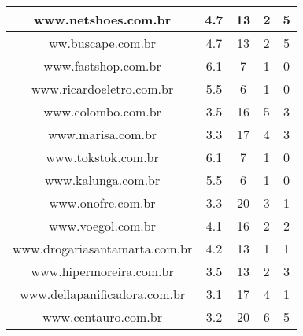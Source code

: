 \begin{center}
\begin{longtable}{|l|l|l|l|l|}
\hline
\multicolumn{1}{|c|}{www.netshoes.com.br} & \multicolumn{1}{c|}{4.7} & \multicolumn{1}{c|}{13} & \multicolumn{1}{c|}{2} & \multicolumn{1}{c|}{5} \\ 
\hline
\multicolumn{1}{|c|}{ww.buscape.com.br} & \multicolumn{1}{c|}{4.7} & \multicolumn{1}{c|}{13} & \multicolumn{1}{c|}{2} & \multicolumn{1}{c|}{5} \\ 
\hline
\multicolumn{1}{|c|}{www.fastshop.com.br} & \multicolumn{1}{c|}{6.1} & \multicolumn{1}{c|}{7} & \multicolumn{1}{c|}{1} & \multicolumn{1}{c|}{0} \\ 
\hline
\multicolumn{1}{|c|}{www.ricardoeletro.com.br} & \multicolumn{1}{c|}{5.5} & \multicolumn{1}{c|}{6} & \multicolumn{1}{c|}{1} & \multicolumn{1}{c|}{0} \\ 
\hline
\multicolumn{1}{|c|}{www.colombo.com.br} & \multicolumn{1}{c|}{3.5} & \multicolumn{1}{c|}{16} & \multicolumn{1}{c|}{5} & \multicolumn{1}{c|}{3} \\ 
\hline
\multicolumn{1}{|c|}{www.marisa.com.br} & \multicolumn{1}{c|}{3.3} & \multicolumn{1}{c|}{17} & \multicolumn{1}{c|}{4} & \multicolumn{1}{c|}{3} \\ 
\hline
\multicolumn{1}{|c|}{www.tokstok.com.br} & \multicolumn{1}{c|}{6.1} & \multicolumn{1}{c|}{7} & \multicolumn{1}{c|}{1} & \multicolumn{1}{c|}{0} \\ 
\hline
\multicolumn{1}{|c|}{www.kalunga.com.br} & \multicolumn{1}{c|}{5.5} & \multicolumn{1}{c|}{6} & \multicolumn{1}{c|}{1} & \multicolumn{1}{c|}{0} \\ 
\hline
\multicolumn{1}{|c|}{www.onofre.com.br} & \multicolumn{1}{c|}{3.3} & \multicolumn{1}{c|}{20} & \multicolumn{1}{c|}{3} & \multicolumn{1}{c|}{1} \\ 
\hline
\multicolumn{1}{|c|}{www.voegol.com.br} & \multicolumn{1}{c|}{4.1} & \multicolumn{1}{c|}{16} & \multicolumn{1}{c|}{2} & \multicolumn{1}{c|}{2} \\ 
\hline
\multicolumn{1}{|c|}{www.drogariasantamarta.com.br} & \multicolumn{1}{c|}{4.2} & \multicolumn{1}{c|}{13} & \multicolumn{1}{c|}{1} & \multicolumn{1}{c|}{1} \\ 
\hline
\multicolumn{1}{|c|}{www.hipermoreira.com.br} & \multicolumn{1}{c|}{3.5} & \multicolumn{1}{c|}{13} & \multicolumn{1}{c|}{2} & \multicolumn{1}{c|}{3} \\ 
\hline
\multicolumn{1}{|c|}{www.dellapanificadora.com.br} & \multicolumn{1}{c|}{3.1} & \multicolumn{1}{c|}{17} & \multicolumn{1}{c|}{4} & \multicolumn{1}{c|}{1} \\ 
\hline
\multicolumn{1}{|c|}{www.centauro.com.br} & \multicolumn{1}{c|}{3.2} & \multicolumn{1}{c|}{20} & \multicolumn{1}{c|}{6} & \multicolumn{1}{c|}{5} \\ 

\end{longtable}
\end{center}
